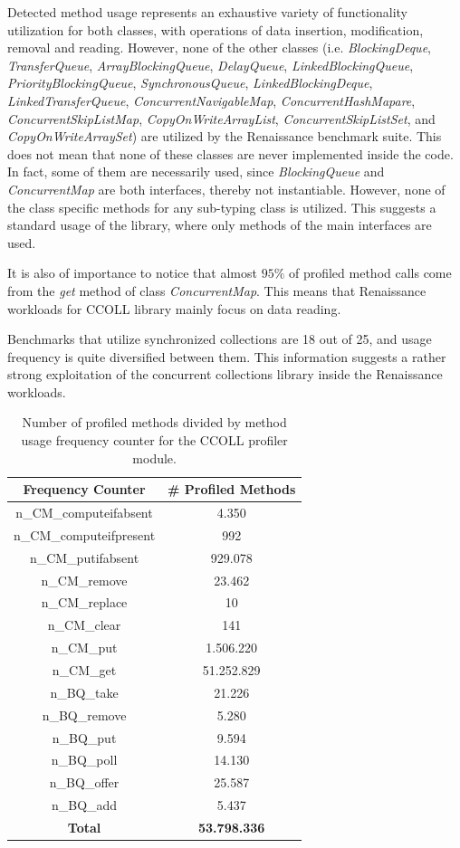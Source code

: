 \documentclass[]{usiinfthesis}
\begin{document}
 Detected method usage represents an exhaustive variety of functionality utilization for both classes, with operations of data insertion, modification, removal and reading. However, none of the other classes (i.e. \textit{BlockingDeque}, \textit{TransferQueue}, \textit{ArrayBlockingQueue}, \textit{DelayQueue}, \textit{LinkedBlockingQueue}, \textit{PriorityBlockingQueue}, \textit{SynchronousQueue}, \textit{LinkedBlockingDeque}, \textit{LinkedTransferQueue}, \textit{ConcurrentNavigableMap}, \textit{ConcurrentHashMapare}, \textit{ConcurrentSkipListMap}, \textit{CopyOnWriteArrayList}, \textit{ConcurrentSkipListSet}, and \textit{CopyOnWriteArraySet}) are utilized by the Renaissance benchmark suite. This does not mean that none of these classes are never implemented inside the code. In fact, some of them are necessarily used, since \textit{BlockingQueue} and \textit{ConcurrentMap} are both interfaces, thereby not instantiable. However, none of the class specific methods for any sub-typing class is utilized. This suggests a standard usage of the library, where only methods of the main interfaces are used.
 
 It is also of importance to notice that almost \(95\%\) of profiled method calls come from the \textit{get} method of class \textit{ConcurrentMap}. This means that Renaissance workloads for CCOLL library mainly focus on data reading.
 
 Benchmarks that utilize synchronized collections are 18 out of 25, and usage frequency is quite diversified between them. This information suggests a rather strong exploitation of the concurrent collections library inside the Renaissance workloads.

\begin{table}
\centering
\caption{Number of profiled methods divided by method usage frequency counter for the CCOLL profiler module.}
\begin{tabular}{|c|c|}
\hline
\textbf{Frequency Counter} & \textbf{# Profiled Methods} \\
\hline
n\_CM\_computeifabsent	&	 4.350 	 \\ 
n\_CM\_computeifpresent	&	 992 	 \\ 
n\_CM\_putifabsent	&	 929.078 	 \\ 
n\_CM\_remove	&	 23.462 	 \\ 
n\_CM\_replace	&	 10 	 \\ 
n\_CM\_clear	&	 141 	 \\ 
n\_CM\_put	&	 1.506.220 	 \\ 
n\_CM\_get	&	 51.252.829 	 \\ 
n\_BQ\_take	&	 21.226 	 \\ 
n\_BQ\_remove	&	 5.280 	 \\ 
n\_BQ\_put	&	 9.594 	 \\ 
n\_BQ\_poll	&	 14.130 	 \\ 
n\_BQ\_offer	&	 25.587 	 \\ 
n\_BQ\_add	&	 5.437 	 \\ 
\hline
\hline
\textbf{Total}	&	  \textbf{53.798.336}    	 \\ 
\hline
\end{tabular}
\end{table}%
\end{document}
